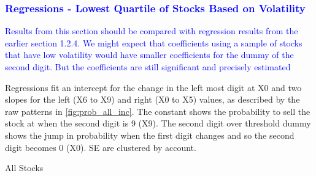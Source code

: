 \clearpage




\subsubsection{\textcolor{blue}{Regressions - Lowest Quartile of Stocks Based on Volatility}}

\textcolor{blue}{Results from this section should be compared with regression results from the earlier section 1.2.4. We might expect that coefficients using a sample of stocks that have low volatility would have smaller coefficients for the dummy of the second digit. But the coefficients are still significant and precisely estimated }



Regressions fit an intercept for the change in the left most digit at X0 and two slopes for the left (X6 to X9) and right (X0 to X5) values, as described by the raw patterns in \ref{fig:prob_all_inc}. 
The constant shows the probability to sell the stock at when the second digit is 9 (X9). The second digit over threshold dummy shows the jump in probability when the first digit changes and so the second digit becomes 0 (X0). SE are clustered by account.

\begin{econtable}[h]\footnotesize
	\caption{All Stocks}
	\label{tab:}
\end{econtable}


